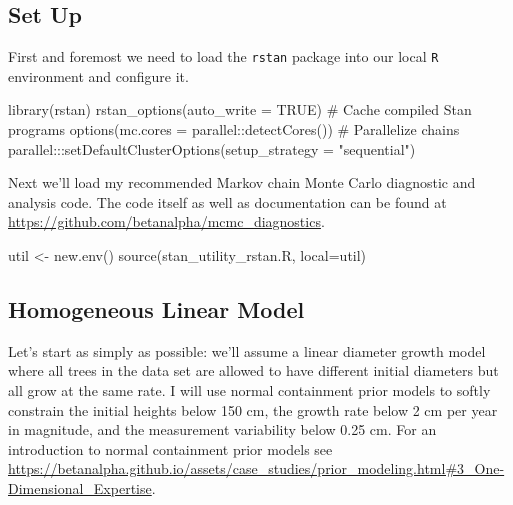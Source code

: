 \documentclass[
  letterpaper,
  DIV=11,
  numbers=noendperiod]{scrartcl}
\newenvironment{Shaded}{\begin{snugshade}}{\end{snugshade}}
\newcommand{\AttributeTok}[1]{\textcolor[rgb]{0.40,0.45,0.13}{#1}}
\newcommand{\CommentTok}[1]{\textcolor[rgb]{0.37,0.37,0.37}{#1}}
\newcommand{\ConstantTok}[1]{\textcolor[rgb]{0.56,0.35,0.01}{#1}}
\newcommand{\FunctionTok}[1]{\textcolor[rgb]{0.28,0.35,0.67}{#1}}
\newcommand{\NormalTok}[1]{\textcolor[rgb]{0.00,0.23,0.31}{#1}}
\newcommand{\OtherTok}[1]{\textcolor[rgb]{0.00,0.23,0.31}{#1}}
\newcommand{\SpecialCharTok}[1]{\textcolor[rgb]{0.37,0.37,0.37}{#1}}
\newcommand{\StringTok}[1]{\textcolor[rgb]{0.13,0.47,0.30}{#1}}
\begin{document}
\hypertarget{sec:setup}{%
\subsection{Set Up}\label{sec:setup}}

First and foremost we need to load the \texttt{rstan} package into our
local \texttt{R} environment and configure it.

\begin{Shaded}
\begin{Highlighting}[]
\FunctionTok{library}\NormalTok{(rstan)}
\FunctionTok{rstan\_options}\NormalTok{(}\AttributeTok{auto\_write =} \ConstantTok{TRUE}\NormalTok{)            }\CommentTok{\# Cache compiled Stan programs}
\FunctionTok{options}\NormalTok{(}\AttributeTok{mc.cores =}\NormalTok{ parallel}\SpecialCharTok{::}\FunctionTok{detectCores}\NormalTok{()) }\CommentTok{\# Parallelize chains}
\NormalTok{parallel}\SpecialCharTok{:::}\FunctionTok{setDefaultClusterOptions}\NormalTok{(}\AttributeTok{setup\_strategy =} \StringTok{"sequential"}\NormalTok{)}
\end{Highlighting}
\end{Shaded}

Next we'll load my recommended Markov chain Monte Carlo diagnostic and
analysis code. The code itself as well as documentation can be found at
\url{https://github.com/betanalpha/mcmc_diagnostics}.

\begin{Shaded}
\begin{Highlighting}[]
\NormalTok{util }\OtherTok{\textless{}{-}} \FunctionTok{new.env}\NormalTok{()}
\FunctionTok{source}\NormalTok{(}\StringTok{\textquotesingle{}stan\_utility\_rstan.R\textquotesingle{}}\NormalTok{, }\AttributeTok{local=}\NormalTok{util)}
\end{Highlighting}
\end{Shaded}

\hypertarget{sec:homo-linear}{%
\subsection{Homogeneous Linear Model}\label{sec:homo-linear}}

Let's start as simply as possible: we'll assume a linear diameter growth
model where all trees in the data set are allowed to have different
initial diameters but all grow at the same rate. I will use normal
containment prior models to softly constrain the initial heights below
150 cm, the growth rate below 2 cm per year in magnitude, and the
measurement variability below 0.25 cm. For an introduction to normal
containment prior models see
\url{https://betanalpha.github.io/assets/case_studies/prior_modeling.html\#3_One-Dimensional_Expertise}.
\end{document}
